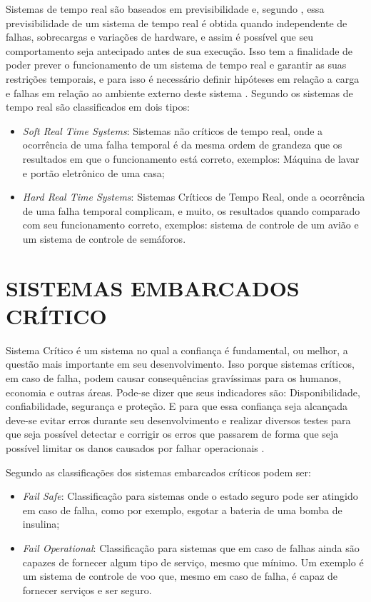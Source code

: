 Sistemas de tempo real são baseados em previsibilidade e, segundo \cite{farines2000sistemas}, essa previsibilidade de um sistema de tempo real é obtida quando independente de falhas, sobrecargas e variações de hardware, e assim é possível que seu comportamento seja antecipado antes de sua execução. Isso tem a finalidade de poder prever o funcionamento de um sistema de tempo real e garantir as suas restrições temporais, e para isso é necessário definir hipóteses em relação a carga e falhas em relação ao ambiente externo deste sistema \cite{farines2000sistemas}. 
Segundo \cite{mall2009real} os sistemas de tempo real são classificados em dois tipos:
\begin{itemize}
\item \emph{Soft Real Time Systems}: Sistemas não críticos de tempo real, onde a ocorrência de uma falha temporal é da mesma ordem de grandeza que os resultados em que o funcionamento está correto, exemplos: Máquina de lavar e portão eletrônico de uma casa;
\item \emph{Hard Real Time Systems}: Sistemas Críticos de Tempo Real, onde a ocorrência de uma falha temporal complicam, e muito, os resultados quando comparado com seu funcionamento correto, exemplos: sistema de controle de um avião e um sistema de controle de semáforos.
\end{itemize}

\section{SISTEMAS EMBARCADOS CRÍTICO}
\label{sec:SistemaEmbarcado}

Sistema Crítico é um sistema no qual a confiança é fundamental, ou melhor, a questão mais importante em seu desenvolvimento. Isso porque sistemas críticos, em caso de falha, podem causar consequências gravíssimas para os humanos, economia e outras áreas. Pode-se dizer que seus indicadores são: Disponibilidade, confiabilidade, segurança e proteção. E para que essa confiança seja alcançada deve-se evitar erros durante seu desenvolvimento e realizar diversos testes para que seja possível detectar e corrigir os erros que passarem de forma que seja possível limitar os danos causados por falhar operacionais \cite{sommerville2004software,feldmann2007survey,jordan2006standard}.

Segundo \cite{kopetz2011real} as classificações dos sistemas embarcados críticos podem ser:
\begin{itemize}
\item \emph{Fail Safe}: Classificação para sistemas onde o estado seguro pode ser atingido em caso de falha, como por exemplo, esgotar a bateria de uma bomba de insulina;
\item \emph{Fail Operational}: Classificação para sistemas que em caso de falhas ainda são capazes de fornecer algum tipo de serviço, mesmo que mínimo. Um exemplo é um sistema de controle de voo que, mesmo em caso de falha, é capaz de fornecer serviços e ser seguro.
\end{itemize}

